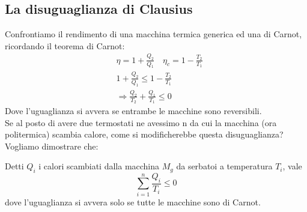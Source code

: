 \documentclass[
10pt, %
a4paper, %
oneside, %
headinclude,footinclude, %
BCOR5mm, %
]{scrartcl}
\begin{document}
\subsection{La disuguaglianza di Clausius}
Confrontiamo il rendimento di una macchina termica generica ed una di Carnot, ricordando il teorema di Carnot:
\begin{align*}
	&\eta = 1 + \frac{Q_2}{Q_1} \quad \eta_c = 1 - \frac{T_2}{T_1}\\
	&1 + \frac{Q_2}{Q_1} \leq  1 - \frac{T_2}{T_1}\\
	&\Rightarrow \frac{Q_2}{T_2}+\frac{Q_1}{T_1}\leq 0
\end{align*}
Dove l'uguaglianza si avvera se entrambe le macchine sono reversibili.\\
Se al posto di avere due termostati ne avessimo n da cui la macchina (ora politermica) scambia calore, come si modificherebbe questa disuguaglianza? Vogliamo dimostrare che:
\begin{prop}
	Detti \(Q_i\) i calori scambiati dalla macchina \(M_g\) da serbatoi a temperatura \(T_i\), vale
	\[\sum_{i=1}^{n}\frac{Q_i}{T_i}\leq 0\]
	dove l'uguaglianza si avvera solo se tutte le macchine sono di Carnot.
\end{prop}
\end{document}
